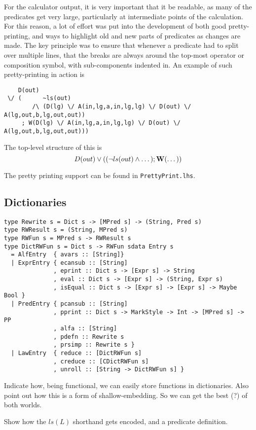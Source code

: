 For the calculator output,
it is very important that it be readable,
as many of the predicates get very large,
particularly at intermediate points of the calculation.
For this reason, a lot of effort was put into the development
of both good pretty-printing,
and ways to highlight old and new parts of predicates as changes are made.
The key principle was to ensure that whenever a predicate
had to split over multiple lines,
that the breaks are always around the top-most operator or composition
symbol, with sub-components indented in.
An example of such pretty-printing in action is
{\small
\begin{verbatim}
    D(out)
 \/ (      ~ls(out)
        /\ (D(lg) \/ A(in,lg,a,in,lg,lg) \/ D(out) \/ A(lg,out,b,lg,out,out))
     ; W(D(lg) \/ A(in,lg,a,in,lg,lg) \/ D(out) \/ A(lg,out,b,lg,out,out)))
\end{verbatim}
}
The top-level structure of this is
\[D(out) \lor ( (\lnot ls(out) \land \dots) ; \mathbf{W}(\dots) )\]

The pretty printing support can be found in \texttt{PrettyPrint.lhs}.

\subsection{Dictionaries}\label{ssec:dict}

\begin{verbatim}
type Rewrite s = Dict s -> [MPred s] -> (String, Pred s)
type RWResult s = (String, MPred s)
type RWFun s = MPred s -> RWResult s
type DictRWFun s = Dict s -> RWFun sdata Entry s
  = AlfEntry  { avars :: [String]}
  | ExprEntry { ecansub :: [String]
              , eprint :: Dict s -> [Expr s] -> String
              , eval :: Dict s -> [Expr s] -> (String, Expr s)
              , isEqual :: Dict s -> [Expr s] -> [Expr s] -> Maybe Bool }
  | PredEntry { pcansub :: [String]
              , pprint :: Dict s -> MarkStyle -> Int -> [MPred s] -> PP
              , alfa :: [String]
              , pdefn :: Rewrite s
              , prsimp :: Rewrite s }
  | LawEntry  { reduce :: [DictRWFun s]
              , creduce :: [CDictRWFun s]
              , unroll :: [String -> DictRWFun s] }
\end{verbatim}

Indicate how, being functional, we can easily store functions
in dictionaries.
Also point out how this is a form of shallow-embedding.
So we can get the best (?) of both worlds\cite{Gibbons:2014:FDS}.

Show how the $ls(L)$ shorthand gets encoded,
and a predicate definition.

